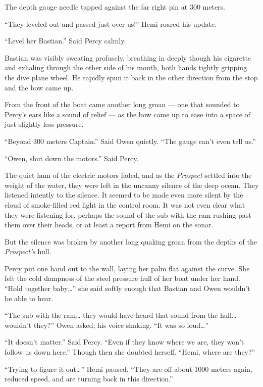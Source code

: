 \documentclass[
]{scrbook}
\begin{document}
The depth gauge needle tapped against the far right pin at 300 meters.

``They leveled out and passed just over us!'' Hemi roared his update.

``Level her Bastian.'' Said Percy calmly.

Bastian was visibly sweating profusely, breathing in deeply though his
cigarette and exhaling through the other side of his mouth, both hands
tightly gripping the dive plane wheel. He rapidly spun it back in the
other direction from the stop and the bow came up.

From the front of the boat came another long groan --- one that sounded
to Percy's ears like a sound of relief --- as the bow came up to ease
into a space of just slightly less pressure.

``Beyond 300 meters Captain.'' Said Owen quietly. ``The gauge can't even
tell us.''

``Owen, shut down the motors.'' Said Percy.

The quiet hum of the electric motors faded, and as the \emph{Prospect}
settled into the weight of the water, they were left in the uncanny
silence of the deep ocean. They listened intently to the silence. It
seemed to be made even more silent by the cloud of smoke-filled red
light in the control room. It was not even clear what they were
listening for, perhaps the sound of the sub with the ram rushing past
them over their heads, or at least a report from Hemi on the sonar.

But the silence was broken by another long quaking groan from the depths
of the \emph{Prospect's} hull.

Percy put one hand out to the wall, laying her palm flat against the
curve. She felt the cold dampness of the steel pressure hull of her boat
under her hand. ``Hold together baby\ldots{}'' she said softly enough
that Bastian and Owen wouldn't be able to hear.

``The sub with the ram\ldots{} they would have heard that sound from the
hull\ldots{} wouldn't they?'' Owen asked, his voice shaking. ``It was so
loud\ldots{}''

``It doesn't matter.'' Said Percy. ``Even if they know where we are,
they won't follow us down here.'' Though then she doubted herself.
``Hemi, where are they?''

``Trying to figure it out\ldots{}'' Hemi paused. ``They are off about
1000 meters again, reduced speed, and are turning back in this
direction.''
\end{document}
